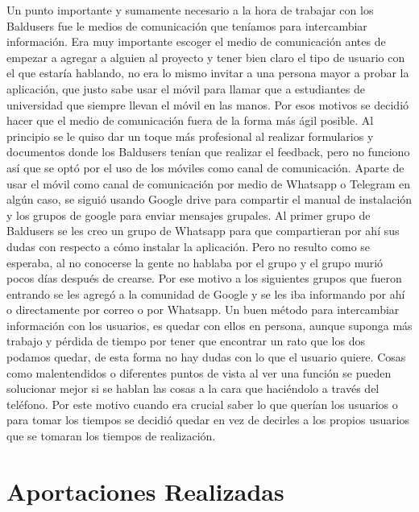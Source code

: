 Un punto importante y sumamente necesario a la hora de trabajar con los Baldusers fue le medios de comunicación que teníamos para intercambiar información.
Era muy importante escoger el medio de comunicación antes de empezar a agregar a alguien al proyecto y tener bien claro el tipo de usuario con el que estaría hablando, no era lo mismo invitar a una persona mayor a probar la aplicación, que justo sabe usar el móvil para llamar que a estudiantes de universidad que siempre llevan el móvil en las manos.
Por esos motivos se decidió hacer que el medio de comunicación fuera de la forma más ágil posible.
Al principio se le quiso dar un toque más profesional al realizar formularios y documentos donde los Baldusers tenían que realizar el feedback, pero no funciono así que se optó por el uso de los móviles como canal de comunicación.
Aparte de usar el móvil como canal de comunicación por medio de Whatsapp o Telegram en algún caso, se siguió usando Google drive para compartir el manual de instalación y los grupos de google para enviar mensajes grupales.
Al primer grupo de Baldusers se les creo un grupo de Whatsapp para que compartieran por ahí sus dudas con respecto a cómo instalar la aplicación. Pero no resulto como se esperaba, al no conocerse la gente no hablaba por el grupo y el grupo murió pocos días después de crearse.
Por ese motivo a los siguientes grupos que fueron entrando se les agregó a la comunidad de Google y se les iba informando por ahí o directamente por correo o por Whatsapp.
Un buen método para intercambiar información con los usuarios,  es quedar con ellos en persona, aunque suponga más trabajo y pérdida de tiempo por tener que encontrar un rato que los dos podamos quedar, de esta forma no hay dudas con lo que el usuario quiere.
Cosas como malentendidos o diferentes puntos de vista al ver una función se pueden solucionar mejor si se hablan las cosas a la cara que haciéndolo a través del teléfono.
Por este motivo cuando era crucial saber lo que querían los usuarios o para tomar los tiempos se decidió quedar en vez de decirles a los propios usuarios que se tomaran los tiempos de realización.



\section{Aportaciones Realizadas}
\label{secc:aportaciones Realizadas}

